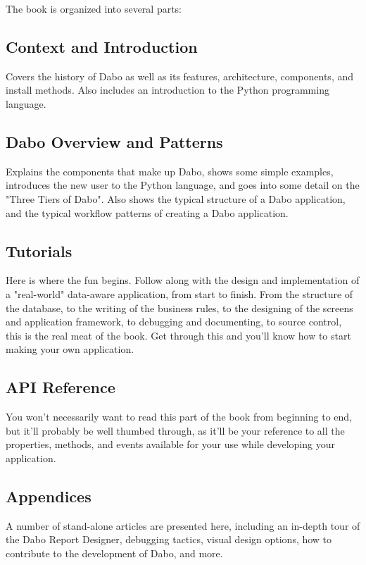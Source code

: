 The book is organized into several parts:

\subsection{Context and Introduction}

Covers the history of Dabo as well as its features, architecture, components, and install methods. Also includes an introduction to the Python programming language.

\subsection{Dabo Overview and Patterns}

Explains the components that make up Dabo, shows some simple examples, introduces the new user to the Python language, and goes into some detail on the "Three Tiers of Dabo". Also shows the typical structure of a Dabo application, and the typical workflow patterns of creating a Dabo application.

\subsection{Tutorials}

Here is where the fun begins. Follow along with the design and implementation of a "real-world" data-aware application, from start to finish. From the structure of the database, to the writing of the business rules, to the designing of the screens and application framework, to debugging and documenting, to source control, this is the real meat of the book. Get through this and you'll know how to start making your own application.

\subsection{API Reference}

You won't necessarily want to read this part of the book from beginning to end, but it'll probably be well thumbed through, as it'll be your reference to all the properties, methods, and events available for your use while developing your application.

\subsection{Appendices}

A number of stand-alone articles are presented here, including an in-depth tour of the Dabo Report Designer, debugging tactics, visual design options, how to contribute to the development of Dabo, and more.
